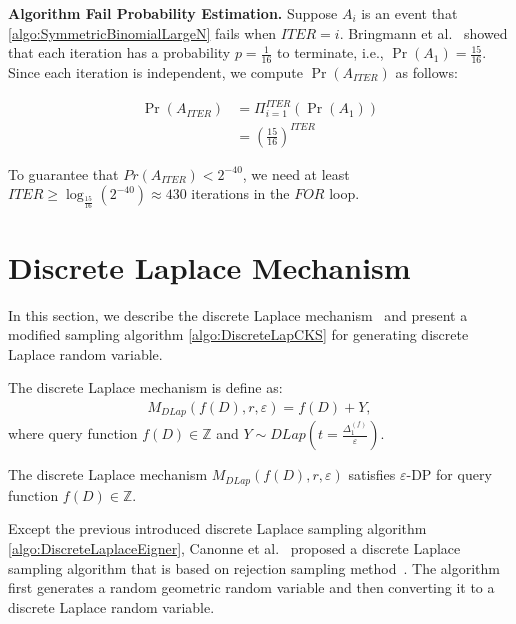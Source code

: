 \textbf{Algorithm Fail Probability Estimation. }
Suppose $A_i$ is an event that \autoref{algo:SymmetricBinomialLargeN} fails when $ITER=i$.
Bringmann et al.~\cite{bringmann2014internal} showed that each iteration has a probability $p=\frac{1}{16} $ to terminate, i.e., $\Pr\left(A_1\right)=\frac{15}{16} $.
Since each iteration is independent, we compute $\Pr\left(A_{ITER}\right)$ as follows:

\begin{equation}
    \begin{split}
        \Pr\left(A_{ITER}\right) &  =  \Pi _{i=1}^{ITER}\left(\Pr\left(A_1\right) \right) \\
        &=\left(\frac{15}{16}\right)^{ITER}
    \end{split}
\end{equation}

To guarantee that $Pr\left(A_{ITER}\right)<2^{-40}$, we need at least $ITER\geq \log _\frac{15}{16}\left(2^{-40}\right)\approx 430$ iterations in the $FOR$ loop.

\section{Discrete Laplace Mechanism}
\label{sec:discreteLaplacemechanism}

In this section, we describe the discrete Laplace mechanism~\cite{chan2012privacy, ghosh2012universally,eigner2014differentially} and present a modified sampling algorithm \autoref{algo:DiscreteLapCKS} for generating discrete Laplace random variable.

The discrete Laplace mechanism is define as:
\begin{equation}
    \begin{split}
        M_{DLap}\left(f\left(D\right),r,\varepsilon\right)=f\left(D\right) +Y,
    \end{split}
\end{equation}
where query function $f\left(D\right)\in\mathbb{Z} $ and $Y\sim DLap\left(t=\frac{\Delta_1^{\left(f\right) }}{\varepsilon}\right) $.

\begin{theorem}
    The discrete Laplace mechanism $M_{DLap}\left(f\left(D\right),r,\varepsilon\right)$ satisfies $\varepsilon$-DP for query function $f\left(D\right)\in\mathbb{Z} $.
\end{theorem}

Except the previous introduced discrete Laplace sampling algorithm \autoref{algo:DiscreteLaplaceEigner}, Canonne et al.~\cite{canonne2020discrete} proposed a discrete Laplace sampling algorithm that is based on rejection sampling method~\cite{casella2004generalized}. The algorithm first generates a random geometric random variable and then converting it to a discrete Laplace random variable.


